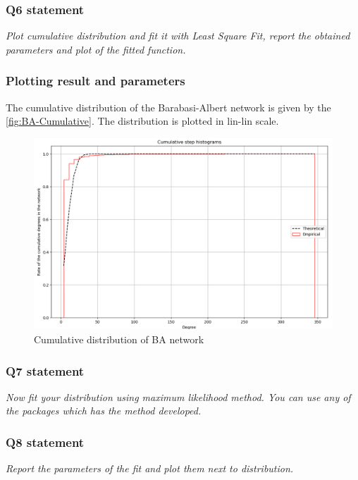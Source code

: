 \documentclass{article}
\begin{document}
\subsubsection{Q6 statement}
\textit{Plot cumulative distribution and fit it with Least Square Fit, report the obtained parameters and plot of the fitted function.}

\subsubsection*{Plotting result and parameters} 
The cumulative distribution of the Barabasi-Albert network is given by the \autoref{fig:BA-Cumulative}. The distribution is plotted in lin-lin scale. 


\begin{figure}[h]
  \centering
  \includegraphics[scale=0.4]{fig/BA-Cumulative.png}
  \caption{Cumulative distribution of BA network}
  \label{fig:BA-Cumulative}
\end{figure}


\subsubsection{Q7 statement}
\textit{Now fit your distribution using maximum likelihood method. You can use any of the packages which has the method developed.}


\subsubsection{Q8 statement}
\textit{Report the parameters of the fit and plot them next to distribution.}
\end{document}
